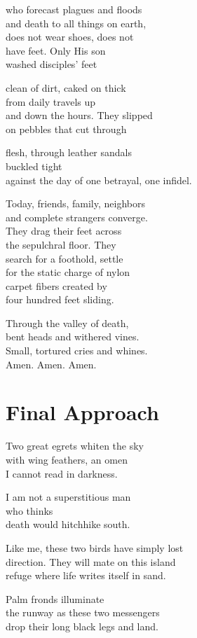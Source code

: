 \documentclass[twoside,10pt]{book}
\begin{document}
who forecast plagues and floods\\
and death to all things on earth,\\
does not wear shoes, does not\\
have feet. Only His son\\
washed disciples' feet

clean of dirt, caked on thick\\
from daily travels up\\
and down the hours. They slipped\\
on pebbles that cut through

flesh, through leather sandals\\
buckled tight\\
against the day of one betrayal, one infidel.

Today, friends, family, neighbors\\
and complete strangers converge.\\
They drag their feet across\\
the sepulchral floor. They\\
search for a foothold, settle\\
for the static charge of nylon\\
carpet fibers created by\\
four hundred feet sliding.

Through the valley of death,\\
bent heads and withered vines.\\
Small, tortured cries and whines.\\
Amen. Amen. Amen.


\clearpage
\section{Final Approach}

Two great egrets whiten the sky\\
with wing feathers, an omen\\
I cannot read in darkness.

I am not a superstitious man\\
who thinks\\
death would hitchhike south.

Like me, these two birds have simply lost\\
direction. They will mate on this island\\
refuge where life writes itself in sand.

Palm fronds illuminate\\
the runway as these two messengers\\
drop their long black legs and land.
\end{document}

